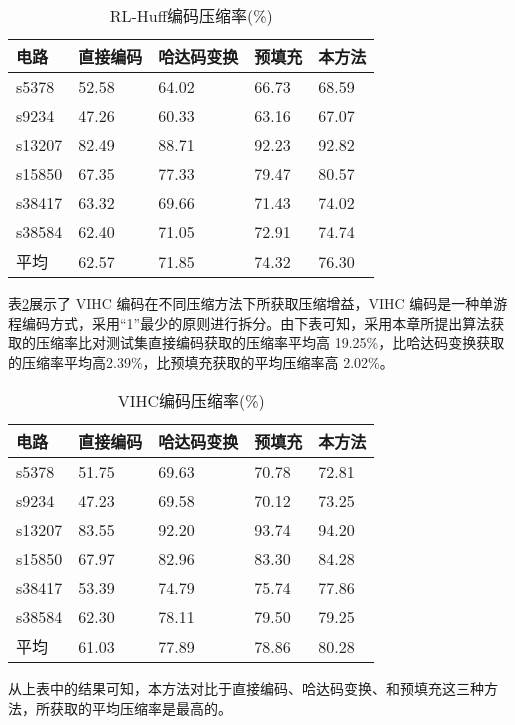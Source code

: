 \begin{table}[H]
\centering
\caption{RL-Huff编码压缩率(\%)}\label{ptabl6}
\begin{tabular}{p{2.2cm}p{2.7cm}<{\centering}p{3.3cm}<{\centering}p{2.7cm}<{\centering}p{2.7cm}<{\centering}}
\toprule
\textbf{电路}&	\textbf{直接编码}& \textbf{哈达码变换}& \textbf{预填充}& \textbf{本方法}\\
\midrule
s5378&	52.58&	64.02&	66.73&	68.59\\
s9234&	47.26&	60.33&	63.16&	67.07\\
s13207&	82.49&	88.71&	92.23&	92.82\\
s15850&	67.35&	77.33&	79.47&	80.57\\
s38417&	63.32&	69.66&	71.43&	74.02\\
s38584&	62.40&	71.05&	72.91&	74.74\\
平均&	62.57&	71.85&	74.32&	76.30\\
\bottomrule
\end{tabular}
\end{table}

表\ref{ptabl7}展示了 VIHC 编码在不同压缩方法下所获取压缩增益，VIHC 编码是一种单游程编码方式，采用“1”最少的原则进行拆分。由下表可知，采用本章所提出算法获取的压缩率比对测试集直接编码获取的压缩率平均高 19.25\%，比哈达码变换获取的压缩率平均高2.39\%，比预填充获取的平均压缩率高 2.02\%。

\begin{table}[H]
\centering
\caption{VIHC编码压缩率(\%)}\label{ptabl7}
\begin{tabular}{p{2.2cm}p{2.7cm}<{\centering}p{3.3cm}<{\centering}p{2.7cm}<{\centering}p{2.7cm}<{\centering}}
\toprule
\textbf{电路}&	\textbf{直接编码}& \textbf{哈达码变换}& \textbf{预填充}& \textbf{本方法}\\
\midrule
s5378&	51.75&	69.63&	70.78&	72.81\\
s9234&	47.23&	69.58&	70.12&	73.25\\
s13207&	83.55&	92.20&	93.74&	94.20\\
s15850&	67.97&	82.96&	83.30&	84.28\\
s38417&	53.39&	74.79&	75.74&	77.86\\
s38584&	62.30&	78.11&	79.50&	79.25\\
平均&	61.03&	77.89&	78.86&	80.28\\
\bottomrule
\end{tabular}
\end{table}

从上表中的结果可知，本方法对比于直接编码、哈达码变换、和预填充这三种方法，所获取的平均压缩率是最高的。

